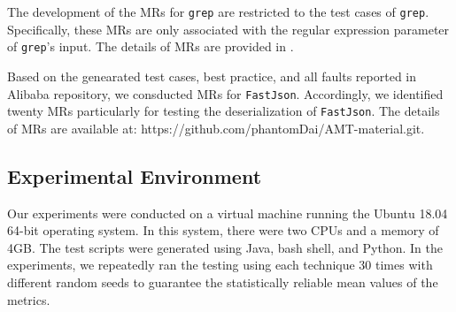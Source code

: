 \documentclass[10pt,journal,compsoc]{IEEEtran}
\begin{document}

The development of the MRs for \texttt{grep} are restricted to the test cases of \texttt{grep}. Specifically, these MRs are only associated with the regular expression parameter of \texttt{grep}'s input. The details of MRs are provided in \cite{barus2010depth}.

Based on the genearated test cases, best practice, and all faults reported in Alibaba repository, we consducted MRs for \texttt{FastJson}. Accordingly, we identified twenty MRs particularly for testing  the deserialization of \texttt{FastJson}. The details of MRs are available at: https://github.com/phantomDai/AMT-material.git.



\subsection{Experimental Environment}
Our experiments were conducted on a virtual machine running the Ubuntu 18.04 64-bit operating system. In this system, there were two CPUs and a memory of 4GB. The test scripts were generated using Java, bash shell, and Python. In the experiments, we repeatedly ran the testing using each technique 30 times \cite{arcuri2011practical} with different random seeds to guarantee the statistically reliable mean values of the metrics.
\end{document}
